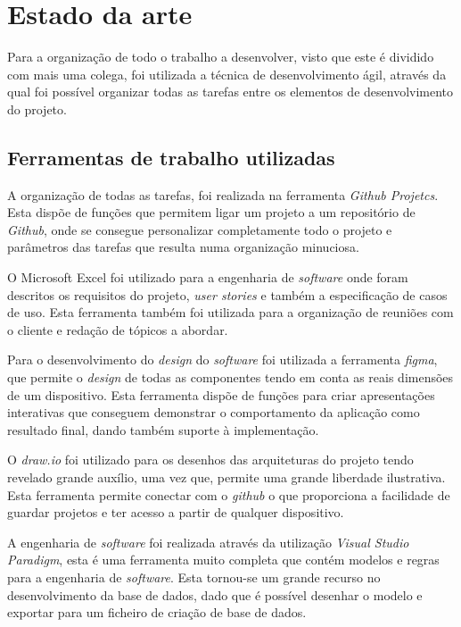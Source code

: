 
\chapter{Estado da arte}
Para a organização de todo o trabalho a desenvolver, visto que este é dividido com mais uma colega, foi utilizada a técnica de desenvolvimento ágil, através da qual foi possível organizar todas as tarefas entre os elementos de desenvolvimento do projeto.

\section{Ferramentas de trabalho utilizadas}

A organização de todas as tarefas, foi realizada na ferramenta \textit{Github Projetcs}. Esta dispõe de funções que permitem ligar um projeto a um repositório de \textit{Github}, onde se consegue personalizar completamente todo o projeto e parâmetros das tarefas que resulta numa organização minuciosa.

O Microsoft Excel foi utilizado para a engenharia de \textit{software} onde foram descritos os requisitos do projeto, \textit{user stories} e também a especificação de casos de uso. Esta ferramenta também foi utilizada para a organização de reuniões com o cliente e redação de tópicos a abordar.

Para o desenvolvimento do \textit{design} do \textit{software} foi utilizada a ferramenta \textit{figma}, que permite o \textit{design} de todas as componentes tendo em conta as reais dimensões de um dispositivo. Esta ferramenta dispõe de funções para criar apresentações interativas que conseguem demonstrar o comportamento da aplicação como resultado final, dando também suporte à implementação.

O \textit{draw.io} foi utilizado para os desenhos das arquiteturas do projeto tendo revelado grande auxílio, uma vez que, permite uma grande liberdade ilustrativa. Esta ferramenta permite conectar com o \textit{github} o que proporciona a facilidade de guardar projetos e ter acesso a partir de qualquer dispositivo.

A engenharia de \textit{software} foi realizada através da utilização \textit{Visual Studio Paradigm}, esta é uma ferramenta muito completa que contém modelos e regras para a engenharia de \textit{software}. Esta tornou-se um grande recurso no desenvolvimento da base de dados, dado que é possível desenhar o modelo e exportar para um ficheiro de criação de base de dados.

